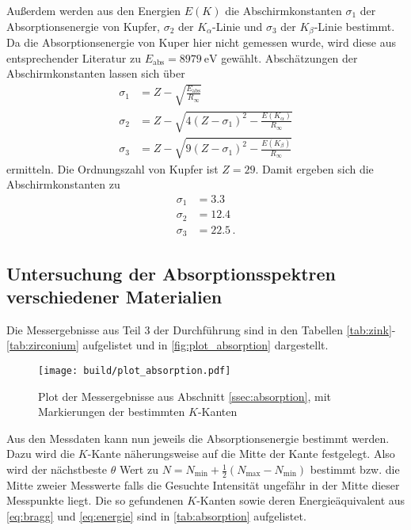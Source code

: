 Außerdem werden aus den Energien $E(K)$ die Abschirmkonstanten $\sigma_1$ der Absorptionsenergie von Kupfer, $\sigma_2$ der $K_\alpha$-Linie und $\sigma_3$ der $K_\beta$-Linie bestimmt.
Da die Absorptionsenergie von Kuper hier nicht gemessen wurde, wird diese aus entsprechender Literatur zu $E_\text{abs}=\SI{8979}{\electronvolt}$ gewählt.\cite{absorption}
Abschätzungen der Abschirmkonstanten lassen sich über 
\begin{align}
    \sigma_1 &= Z - \sqrt{\frac{E_\text{abs}}{R_\infty}} \\
    \sigma_2 &= Z - \sqrt{4(Z-\sigma_1)^2-\frac{E(K_\alpha)}{R_\infty}} \\
    \sigma_3 &= Z - \sqrt{9(Z-\sigma_1)^2-\frac{E(K_\beta)}{R_\infty}}
\end{align}
ermitteln.\cite[Gleichungen (8),(9),(10)]{V602} 
Die Ordnungszahl von Kupfer ist $Z=29$.
Damit ergeben sich die Abschirmkonstanten zu
\begin{align*}
    \sigma_1 &= \num{3.3} \\
    \sigma_2 &= \num{12.4} \\
    \sigma_3 &= \num{22.5} \, .
\end{align*}



\subsection{Untersuchung der Absorptionsspektren verschiedener Materialien}
\label{ssec:absorption_auswertung}

Die Messergebnisse aus Teil 3 der Durchführung sind in den Tabellen \ref{tab:zink}-\ref{tab:zirconium} aufgelistet und in \autoref{fig:plot_absorption} dargestellt.

\begin{figure}
    \centering
    \texttt{[image: build/plot\_absorption.pdf]}
    \caption{Plot der Messergebnisse aus Abschnitt \ref{ssec:absorption}, mit Markierungen der bestimmten $K$-Kanten}
    \label{fig:plot_absorption}
\end{figure}

Aus den Messdaten kann nun jeweils die Absorptionsenergie bestimmt werden.
Dazu wird die $K$-Kante näherungsweise auf die Mitte der Kante festgelegt.
Also wird der nächstbeste $\theta$ Wert zu $N=N_\text{min} + \frac{1}{2}(N_\text{max}-N_\text{min})$ bestimmt bzw. die Mitte zweier Messwerte falls die Gesuchte Intensität ungefähr in der Mitte dieser Messpunkte liegt.
Die so gefundenen $K$-Kanten sowie deren Energieäquivalent aus \autoref{eq:bragg} und \ref{eq:energie} sind in \autoref{tab:absorption} aufgelistet.

